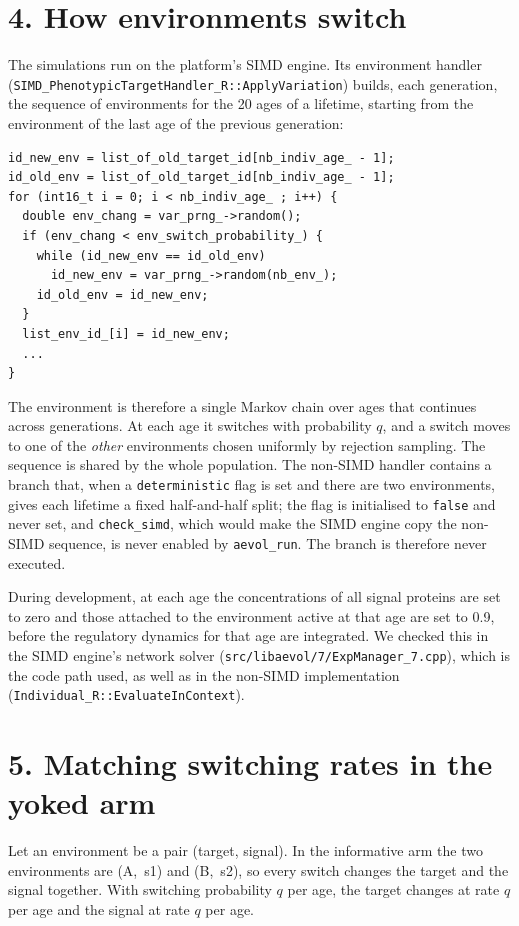 \section*{4. How environments switch}
The simulations run on the platform's SIMD engine. Its environment handler
(\texttt{SIMD\_PhenotypicTargetHandler\_R::ApplyVariation}) builds, each
generation, the sequence of environments for the 20 ages of a lifetime, starting
from the environment of the last age of the previous generation:
\begin{lstlisting}
id_new_env = list_of_old_target_id[nb_indiv_age_ - 1];
id_old_env = list_of_old_target_id[nb_indiv_age_ - 1];
for (int16_t i = 0; i < nb_indiv_age_ ; i++) {
  double env_chang = var_prng_->random();
  if (env_chang < env_switch_probability_) {
    while (id_new_env == id_old_env)
      id_new_env = var_prng_->random(nb_env_);
    id_old_env = id_new_env;
  }
  list_env_id_[i] = id_new_env;
  ...
}
\end{lstlisting}
The environment is therefore a single Markov chain over ages that continues
across generations. At each age it switches with probability $q$, and a switch
moves to one of the \emph{other} environments chosen uniformly by rejection
sampling. The sequence is shared by the whole population. The non-SIMD handler
contains a branch that, when a \texttt{deterministic} flag is set and there are
two environments, gives each lifetime a fixed half-and-half split; the flag is
initialised to \texttt{false} and never set, and \texttt{check\_simd}, which would
make the SIMD engine copy the non-SIMD sequence, is never enabled by
\texttt{aevol\_run}. The branch is therefore never executed.

During development, at each age the concentrations of all signal proteins are set
to zero and those attached to the environment active at that age are set to 0.9,
before the regulatory dynamics for that age are integrated. We checked this in the
SIMD engine's network solver (\texttt{src/libaevol/7/ExpManager\_7.cpp}), which is
the code path used, as well as in the non-SIMD implementation
(\texttt{Individual\_R::EvaluateInContext}).

\section*{5. Matching switching rates in the yoked arm}
Let an environment be a pair (target, signal). In the informative arm the two
environments are (A,~s1) and (B,~s2), so every switch changes the target and the signal together. With switching probability $q$ per age, the target changes at rate
$q$ per age and the signal at rate $q$ per age.

